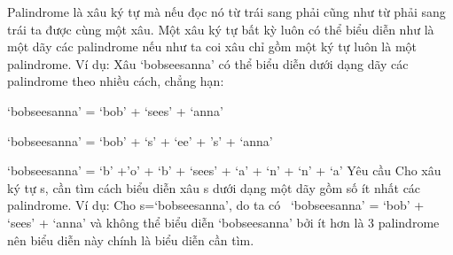 Palindrome là xâu ký tự mà nếu đọc nó từ trái sang phải cũng như từ phải sang trái ta được cùng một xâu. Một xâu ký tự bất kỳ luôn có thể biểu diễn như là một dãy các palindrome nếu như ta coi xâu chỉ gồm một ký tự luôn là một palindrome. Ví dụ: Xâu ‘bobseesanna’ có thể biểu diễn dưới dạng dãy các palindrome theo nhiều cách, chẳng hạn:  

   ‘bobseesanna’ = ‘bob’ + ‘sees’ + ‘anna’  

   ‘bobseesanna’ = ‘bob’ + ‘s’ + ‘ee’ + ’s’ + ‘anna’  

   ‘bobseesanna’ = ‘b’ +’o’ + ‘b’ + ‘sees’ + ‘a’ + ‘n’ + ‘n’ + ‘a’
   Yêu cầu  
Cho xâu ký tự s, cần tìm cách biểu diễn xâu s dưới dạng một dãy gồm số ít nhất các palindrome. Ví dụ: Cho s=‘bobseesanna’, do ta có  ‘bobseesanna’ = ‘bob’ + ‘sees’ + ‘anna’ và không thể biểu diễn ‘bobseesanna’ bởi ít hơn là 3 palindrome nên biểu diễn này chính là biểu diễn cần tìm.